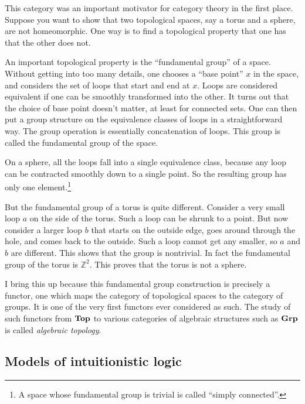 \documentclass{article}
\def\cat#1{{\bf #1}}
\begin{document}
This category was an important motivator for category theory in the
first place.  Suppose you want to show that two topological spaces,
say a torus and a sphere, are not homeomorphic.  One way is to find a
topological property that one has that the other does not.  

An important topological property is the ``fundamental group'' of a
space.  Without getting into too many details, one chooses a ``base
point'' $x$ in the space, and considers the set of loops that start
and end at $x$. Loops are considered equivalent if one can be smoothly
transformed into the other.  It turns out that the choice of base
point doesn't matter, at least for connected sets.  One can then put a
group structure on the equivalence classes of loops in a
straightforward way.  The group operation is essentially concatenation
of loops.  This group is called the fundamental group of the space.

On a sphere, all the loops fall into a single equivalence class,
because any loop can be contracted smoothly down to a single point.
So the resulting group has only one element.\footnote{A space whose
  fundamental group is trivial is called ``simply connected''.}

But the fundamental group of a torus is quite different.  Consider a
very small loop $a$ on the side of the torus.  Such a loop can be
shrunk to a point.  But now consider a larger loop $b$ that starts on
the outside edge, goes around through the hole, and comes back to the
outside. Such a loop cannot get any smaller, so $a$ and $b$ are
different.  This shows that the group is nontrivial.  In fact the
fundamental group of the torus is $\mathbb Z^2$.  This proves that
the torus is not a sphere.


I bring this up because this fundamental group construction is
precisely a functor, one which maps the category of topological spaces
to the category of groups. It is one of the very first functors ever
considered as such.  The study of such functors from $\cat{Top}$ to
various categories of algebraic structures such as $\cat{Grp}$ is
called {\em algebraic topology\/}.

\subsection*{Models of intuitionistic logic}
\end{document}
